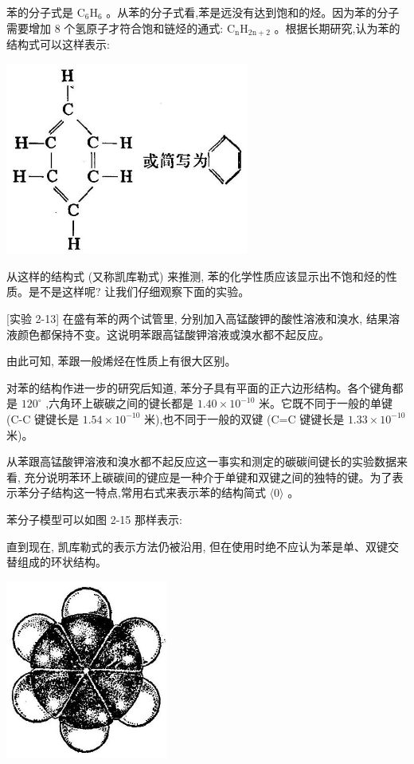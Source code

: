 \documentclass[10pt]{article}
\newcommand{\customfootnote}[1]{
  \let\thefootnote\relax\footnotetext{#1}
}
\begin{document}
苯的分子式是 \({\mathrm{C}}_{6}{\mathrm{H}}_{6}\) 。从苯的分子式看,苯是远没有达到饱和的烃。因为苯的分子需要增加 8 个氢原子才符合饱和链烃的通式: \({\mathrm{C}}_{\mathrm{n}}{\mathrm{H}}_{2\mathrm{n} + 2}\) 。根据长期研究,认为苯的结构式可以这样表示:

\begin{center}
\includegraphics[max width=0.6\textwidth]{images/01912d16-be99-77bb-9535-4f3ed8d9946f_83_930039.jpg}
\end{center}

从这样的结构式 (又称凯库勒式) 来推测, 苯的化学性质应该显示出不饱和烃的性质。是不是这样呢? 让我们仔细观察下面的实验。

[实验 2-13] 在盛有苯的两个试管里, 分别加入高锰酸钾的酸性溶液和溴水, 结果溶液颜色都保持不变。这说明苯跟高锰酸钾溶液或溴水都不起反应。

\customfootnote{

① 苯音 ben。

}

由此可知, 苯跟一般烯烃在性质上有很大区别。

对苯的结构作进一步的研究后知道, 苯分子具有平面的正六边形结构。各个键角都是 \({120}^{ \circ }\) ,六角环上碳碳之间的键长都是 \({1.40} \times {10}^{-{10}}\) 米。它既不同于一般的单键 (C-C 键键长是 \({1.54} \times {10}^{-{10}}\) 米),也不同于一般的双键 (C=C 键键长是 \({1.33} \times {10}^{-{10}}\) 米)。

从苯跟高锰酸钾溶液和溴水都不起反应这一事实和测定的碳碳间键长的实验数据来看, 充分说明苯环上碳碳间的键应是一种介于单键和双键之间的独特的键。为了表示苯分子结构这一特点,常用右式来表示苯的结构简式 \(\langle 0\rangle\) 。

苯分子模型可以如图 2-15 那样表示:

直到现在, 凯库勒式的表示方法仍被沿用, 但在使用时绝不应认为苯是单、双键交替组成的环状结构。

\begin{center}
\includegraphics[max width=0.4\textwidth]{images/01912d16-be99-77bb-9535-4f3ed8d9946f_84_286741.jpg}
\end{center}
\end{document}
